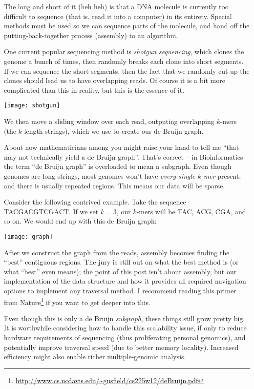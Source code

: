 The long and short of it (heh heh) is that a DNA molecule is currently too difficult to sequence (that is, read it into a computer) in its entirety. Special methods must be used so we can sequence parts of the molecule, and hand off the putting-back-together process (assembly) to an algorithm.

One current popular sequencing method is \emph{shotgun sequencing}, which clones the genome a bunch of times, then randomly breaks each clone into short segments. If we can sequence the short segments, then the fact that we randomly cut up the clones should lead us to have overlapping reads. Of course it is a bit more complicated than this in reality, but this is the essence of it.

\medskip\centerline{\texttt{[image: shotgun]}}\medskip

We then move a sliding window over each read, outputing overlapping $k$-mers (the $k$-length strings), which we use to create our de Bruijn graph.

About now mathematicians among you might raise your hand to tell me ``that may not technically yield a de Bruijn graph''. That's correct -- in Bioinformatics the term ``de Bruijn graph'' is overloaded to mean a subgraph. Even though genomes are long strings, most genomes won't have \emph{every single $k$-mer} present, and there is usually repeated regions. This means our data will be sparse.

Consider the following contrived example. Take the sequence TACGACGTCGACT. If we set $k=3$, our $k$-mers will be TAC, ACG, CGA, and so on. We would end up with this de Bruijn graph:

\medskip\centerline{\texttt{[image: graph]}}\medskip

After we construct the graph from the reads, assembly becomes finding the ``best'' contiguous regions. The jury is still out on what the best method is (or what ``best'' even means); the point of this post isn't about assembly, but our implementation of the data structure and how it provides all required navigation options to implement any traversal method. I recommend reading this primer from Nature\footnote{\url{http://www.cs.ucdavis.edu/~gusfield/cs225w12/deBruijn.pdf}} if you want to get deeper into this.

Even though this is only a de Bruijn \emph{subgraph}, these things still grow pretty big. It is worthwhile considering how to handle this scalability issue, if only to reduce hardware requirements of sequencing (thus proliferating personal genomics), and potentially improve traversal speed (due to better memory locality). Increased efficiency might also enable richer multiple-genomic analysis.

